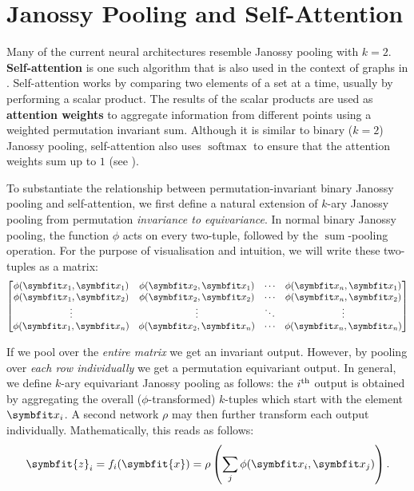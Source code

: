 \section{Janossy Pooling and Self-Attention}\label{sec:jan-attn}

Many of the current neural architectures resemble Janossy pooling with $k=2$.
\textbf{Self-attention} \parencite{vaswani2017attention} is one such algorithm that is also used in the context of graphs in \samptr. Self-attention works by comparing two elements of a set at a time, usually by performing a scalar product.
The results of the scalar products are used as \textbf{attention weights} to aggregate information from different points using a weighted permutation invariant sum. Although it is similar to binary ($k=2$) Janossy pooling, self-attention also uses $\operatorname{softmax}$ to ensure that the attention weights sum up to $1$ (see ).

To substantiate the relationship between permutation-invariant binary Janossy pooling and self-attention, we first define a natural extension of $k$-ary Janossy pooling from permutation \textit{invariance to equivariance}. In normal binary Janossy pooling, the function $\phi$ acts on every two-tuple, followed by the $\operatorname{sum}$-pooling operation. For the purpose of visualisation and intuition, we will write these two-tuples as a matrix:
\begin{equation}
    \begin{bmatrix}
    \phi(\bfitx_1, \bfitx_1) & \phi(\bfitx_2, \bfitx_1) & \cdots & \phi(\bfitx_n, \bfitx_1) \\
    \phi(\bfitx_1, \bfitx_2) & \phi(\bfitx_2, \bfitx_2) & \cdots & \phi(\bfitx_n, \bfitx_2) \\
    \vdots                   &  \vdots              & \ddots & \vdots         \\
    \phi(\bfitx_1, \bfitx_n) & \phi(\bfitx_2, \bfitx_n) & \cdots & \phi(\bfitx_n, \bfitx_n)
    \end{bmatrix}
    \label{eqn:jan-attn-matrix}
\end{equation}

If we pool over the \textit{entire matrix} we get an invariant output. However, by pooling over \textit{each row individually} we get a permutation equivariant output.
In general, we define $k$-ary equivariant Janossy pooling as follows: the $i\textsuperscript{th}$ output is obtained by aggregating the overall ($\phi$-transformed) $k$-tuples which start with the element $\bfitx_i$. A second network $\rho$ may then further transform each output individually. Mathematically, this reads as follows:
\begin{equation}
    \symbfit{z}_i = f_i(\symbfit{x}) = \rho \left( \sum_j \phi(\bfitx_i, \bfitx_j) \right).
    \label{eqn:janossy-attention}
\end{equation}

